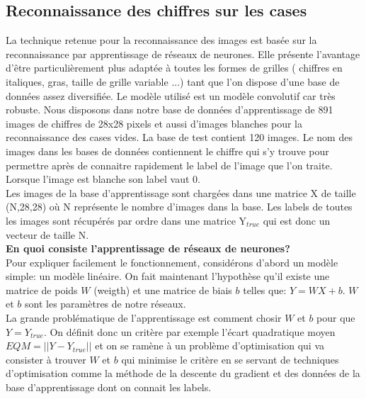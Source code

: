 \documentclass[12pt]{article}
\begin{document}
\subsection{Reconnaissance des chiffres sur les cases}

La technique retenue pour la reconnaissance des images est basée sur la reconnaissance par apprentissage de réseaux de neurones. Elle présente l'avantage d'être particulièrement plus adaptée à toutes les formes de grilles ( chiffres en italiques, gras, taille de grille variable ...) tant que l'on dispose d'une base de données assez diversifiée. Le modèle utilisé est un modèle convolutif car très robuste. Nous disposons dans notre base de données d'apprentissage de 891 images de chiffres de 28x28 pixels et aussi d'images blanches pour la reconnaissance des cases vides. La base de test contient 120 images. Le nom des images dans les bases de données contiennent le chiffre qui s'y trouve pour permettre après de connaitre rapidement le label de l'image que l'on traite. Lorsque l'image est blanche son label vaut 0.\\

\noindent
Les images de la base d'apprentissage sont chargées dans une matrice X de taille (N,28,28) où N représente le nombre d'images dans la base. %
Les labels de toutes les images sont récupérés par ordre dans une matrice Y$_{true}$ qui est donc un vecteur de taille N.\\ %

\textbf{En quoi consiste l'apprentissage de réseaux de neurones?}\\

Pour expliquer facilement le fonctionnement, considérons d'abord un modèle simple: un modèle linéaire. On fait maintenant l'hypothèse qu'il existe une matrice de poids $W$ (weigth) et une matrice de biais $b$ telles que:
$Y = WX+b$. $W$ et $b$ sont les paramètres de notre réseaux.\\
La grande problématique de l'apprentissage est comment chosir $W$ et $b$ pour que $Y = Y_{true}$. On définit donc un critère  par exemple l'écart quadratique moyen $EQM = ||Y - Y_{true}||$ et on se ramène à un problème d'optimisation qui va consister à trouver $W$ et $b$ qui minimise le critère en se servant de techniques d'optimisation comme la méthode de la descente du gradient et des données de la base d'apprentissage dont on connait les labels.\\
\end{document}
